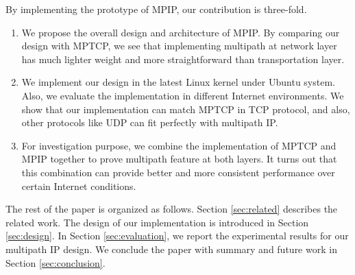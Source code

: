 By implementing the prototype of MPIP, our contribution is three-fold.
\begin{enumerate}
\item We propose the overall design and architecture of MPIP. By comparing our design with MPTCP, we see that implementing multipath at network layer has much lighter weight and more straightforward than transportation layer.

\item We implement our design in the latest Linux kernel under Ubuntu system. Also, we evaluate the implementation in different Internet environments. We show that our implementation can match MPTCP in TCP protocol, and also, other protocols like UDP can fit perfectly with multipath IP.

\item For investigation purpose, we combine the implementation of MPTCP and MPIP together to prove multipath feature at both layers. It turns out that this combination can provide better and more consistent performance over certain Internet conditions.
\end{enumerate}

The rest of the paper is organized as follows. Section \ref{sec:related} describes the related work.
The design of our implementation is introduced in Section \ref{sec:design}. In Section \ref{sec:evaluation}, we report the experimental results for our multipath IP design. We conclude the paper with summary and future work in Section \ref{sec:conclusion}.

